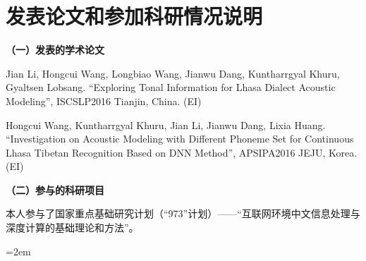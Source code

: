 
\chapter*{发表论文和参加科研情况说明}
\setlength{\parindent}{0em}
\textbf{（一）发表的学术论文}
\begin{publist}
\item Jian Li, Hongcui Wang, Longbiao Wang, Jianwu Dang, Kuntharrgyal Khuru, Gyaltsen Lobsang. “Exploring Tonal Information for Lhasa Dialect Acoustic Modeling”, ISCSLP2016 Tianjin, China. (EI)
\item Hongcui Wang, Kuntharrgyal Khuru, Jian Li, Jianwu Dang, Lixia Huang. “Investigation on Acoustic Modeling with Different Phoneme Set for Continuous Lhasa Tibetan Recognition Based on DNN Method”, APSIPA2016 JEJU, Korea. (EI)
\end{publist}

\vspace*{1em}
\textbf{（二）参与的科研项目}
\begin{publist}
\item 本人参与了国家重点基础研究计划（“973”计划）——“互联网环境中文信息处理与深度计算的基础理论和方法”。
\end{publist}
\vfill
{}\hangindent=2em\noindent

\setlength{\parindent}{2em}
